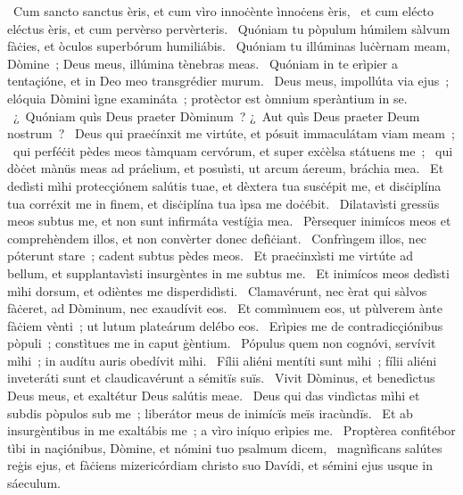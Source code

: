 {~Cum sancto sanctus èris, et cum vìro innoċènte ìnnoċens èris, 
~et cum elécto eléctus èris, et cum pervèrso pervèrteris. 
~Quóniam tu pòpulum húmilem sàlvum fàċies, et òculos superbórum humiliábis. 
~Quóniam tu illúminas luċèrnam meam, Dòmine~; Deus meus, illúmina tènebras meas. 
~Quóniam in te erìpier a tentaçióne, et in Deo meo transgrédier murum. 
~Deus meus, impollúta via ejus~; elóquia Dòmini ìgne examináta~; protèctor est òmnium speràntium in se. 
~¿~Quóniam quìs Deus praeter Dòminum~? ¿~Aut quìs Deus praeter Deum nostrum~? 
~Deus qui praeċínxit me virtúte, et pósuit immaculátam viam meam~; 
~qui perféċit pèdes meos tàmquam cervórum, et super exċèlsa státuens me~; 
~qui dòċet mànüs meas ad práelium, et posuìsti, ut arcum áereum, bráchia mea. 
~Et dedìsti mìhi protecçiónem salútis tuae, et dèxtera tua susċépit me, et disċiplína tua corréxit me in finem, et disċiplína tua ìpsa me doċébit. 
~Dilatavìsti gressüs meos subtus me, et non sunt infirmáta vestíġia mea. 
~Pèrsequer inimícos meos et comprehèndem illos, et non convèrter donec defìċiant. 
~Confrìngem illos, nec póterunt stare~; cadent subtus pèdes meos. 
~Et praeċinxìsti me virtúte ad bellum, et supplantavìsti insurgèntes in me subtus me. 
~Et inimícos meos dedìsti mìhi dorsum, et odièntes me disperdidìsti. 
~Clamavérunt, nec èrat qui sàlvos fàċeret, ad Dòminum, nec exaudívit eos. 
~Et commìnuem eos, ut pùlverem ànte fàċiem vènti~; ut lutum plateárum delébo eos. 
~Erìpies me de contradicçiónibus pòpuli~; constìtues me in caput ġèntium. 
~Pópulus quem non cognóvi, servívit mìhi~; in audítu auris obedívit mìhi. 
~Fílii aliéni mentíti sunt mìhi~; fílii aliéni inveteráti sunt et claudicavérunt a sémitïs suïs. 
~Vivit Dòminus, et benedìctus Deus meus, et exaltétur Deus salútis meae. 
~Deus qui das vindìctas mìhi et subdis pòpulos sub me~; liberátor meus de inimícïs meïs iracùndïs. 
~Et ab insurgèntibus in me exaltábis me~; a vìro iníquo erìpies me. 
~Proptèrea confitébor tìbi in naçiónibus, Dòmine, et nómini tuo psalmum dicem, 
~magnìficans salútes reġis ejus, et fàċiens mizericórdiam christo suo Davídi, et sémini ejus usque in sáeculum. 
}
